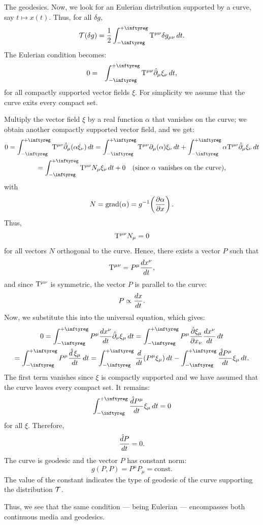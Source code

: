 \begin{Article}{The geodesics.}{}
  Now,
  we look for an Eulerian distribution supported by a curve,
  say $t \mapsto x(t)$.
  Thus,
  for all $\delta g$,
  $$
    \cT(\delta g) = {1 \over 2} \int_{-\infty}^{+\infty} \Torus^{\mu\nu} \delta g_{\mu\nu} \, dt.
  $$
  The Eulerian condition becomes:
  \begin{eqnarray*}
    0 & = & \int_{-\infty}^{+\infty} \Torus^{\mu\nu} \hat\partial_\mu\xi_\nu \, dt,
  \end{eqnarray*}
  for all compactly supported vector fields $\xi$.
  For simplicity we assume that the curve exits every compact set.
  
  Multiply the vector field $\xi$ by a real function $\alpha$ that vanishes on the curve;
  we obtain another compactly supported vector field,
  and we get:
  \begin{multline*}
    0 = \int_{-\infty}^{+\infty} \Torus^{\mu\nu} \hat\partial_\mu(\alpha \xi_\nu) \, dt
    = \int_{-\infty}^{+\infty} \Torus^{\mu\nu} \partial_\mu(\alpha) \xi_\nu \, dt + \int_{-\infty}^{+\infty} \alpha \Torus^{\mu\nu} \hat\partial_\mu \xi_\nu \, dt \\
    = \int_{-\infty}^{+\infty} \Torus^{\mu\nu} N_\mu \xi_\nu \, dt + 0 \quad \text{(since $\alpha$ vanishes on the curve)},
  \end{multline*}
  with
  $$
    N = \operatorname{grad}(\alpha) = g^{-1}\!\left({\partial \alpha \over \partial x}\right).
  $$
  Thus,
  $$
    \mathrm{T}^{\mu\nu} N_\mu = 0
  $$
  for all vectors $N$ orthogonal to the curve.
  Hence,
  there exists a vector $P$ such that
  $$
    \mathrm{T}^{\mu\nu} = P^\mu {dx^\nu \over dt},
  $$
  and since $\mathrm{T}^{\mu\nu}$ is symmetric,
  the vector $P$ is parallel to the curve:
  $$
    P \propto {dx \over dt}.
  $$
  Now,
  we substitute this into the universal equation,
  which gives:
  \begin{multline*}
    0 =\int_{-\infty}^{+\infty} P^\mu {dx^\nu \over dt} \hat\partial_\nu\xi_\mu \, dt
    = \int_{-\infty}^{+\infty} P^\mu {\hat\partial \xi_\mu \over \partial x_\nu}{dx^\nu \over dt} \, dt \\
    = \int_{-\infty}^{+\infty} P^\mu {\hat d\,\xi_\mu \over dt} \, dt
    = \int_{-\infty}^{+\infty} {d \over dt}(P^\mu \xi_\mu) \, dt - \int_{-\infty}^{+\infty} {\hat dP^\mu \over dt} \xi_\mu\, dt.
  \end{multline*}
  The first term vanishes since $\xi$ is compactly supported and we have assumed that the curve leaves every compact set.
  It remains:
  $$
    \int_{-\infty}^{+\infty} {\hat dP^\mu \over dt} \xi_\mu \, dt = 0
  $$
  for all $\xi$.
  Therefore,
  $$
    {\hat dP \over dt} = 0.
  $$
  The curve is geodesic and the vector $P$ has constant norm:
  $$
    g(P,P) = P^\mu P_\mu = \text{const}.
  $$
  The value of the constant indicates the type of geodesic of the curve supporting the distribution $\mathcal{T}$.
  
  Thus,
  we see that the same condition — being Eulerian — encompasses both continuous media and geodesics.
\end{Article}

